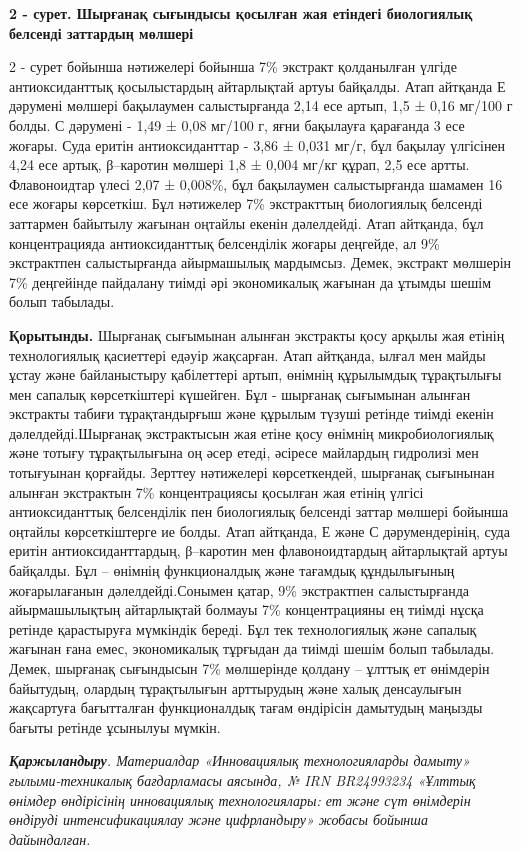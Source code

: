 {\bfseries 2 - сурет. Шырғанақ сығындысы қосылған жая етіндегі биологиялық белсенді заттардың мөлшері}

\begin{multicols}{2}
2 - сурет бойынша нәтижелері бойынша 7\% экстракт қолданылған үлгіде
антиоксиданттық қосылыстардың айтарлықтай артуы байқалды. Атап айтқанда
Е дәрумені мөлшері бақылаумен салыстырғанда 2,14 есе артып, 1,5 ± 0,16
мг/100 г болды. С дәрумені - 1,49 ± 0,08 мг/100 г, яғни бақылауға
қарағанда 3 есе жоғары. Суда еритін антиоксиданттар - 3,86 ± 0,031 мг/г,
бұл бақылау үлгісінен 4,24 есе артық, β--каротин мөлшері 1,8 ± 0,004
мг/кг құрап, 2,5 есе артты. Флавоноидтар үлесі 2,07 ± 0,008\%, бұл
бақылаумен салыстырғанда шамамен 16 есе жоғары көрсеткіш. Бұл нәтижелер
7\% экстракттың биологиялық белсенді заттармен байытылу жағынан оңтайлы
екенін дәлелдейді. Атап айтқанда, бұл концентрацияда антиоксиданттық
белсенділік жоғары деңгейде, ал 9\% экстрактпен салыстырғанда
айырмашылық мардымсыз. Демек, экстракт мөлшерін 7\% деңгейінде пайдалану
тиімді әрі экономикалық жағынан да ұтымды шешім болып табылады.

{\bfseries Қорытынды.} Шырғанақ сығымынан алынған экстракты қосу арқылы жая
етінің технологиялық қасиеттері едәуір жақсарған. Атап айтқанда, ылғал
мен майды ұстау және байланыстыру қабілеттері артып, өнімнің құрылымдық
тұрақтылығы мен сапалық көрсеткіштері күшейген. Бұл - шырғанақ сығымынан
алынған экстракты табиғи тұрақтандырғыш және құрылым түзуші ретінде
тиімді екенін дәлелдейді.Шырғанақ экстрактысын жая етіне қосу өнімнің
микробиологиялық және тотығу тұрақтылығына оң әсер етеді,
әсіресе майлардың гидролизі мен тотығуынан қорғайды. Зерттеу нәтижелері
көрсеткендей, шырғанақ сығынынан алынған экстрактын 7\% концентрациясы
қосылған жая етінің үлгісі антиоксиданттық белсенділік пен биологиялық
белсенді заттар мөлшері бойынша оңтайлы көрсеткіштерге ие болды. Атап
айтқанда, Е және С дәрумендерінің, суда еритін антиоксиданттардың,
β--каротин мен флавоноидтардың айтарлықтай артуы байқалды. Бұл --
өнімнің функционалдық және тағамдық құндылығының жоғарылағанын
дәлелдейді.Сонымен қатар, 9\% экстрактпен салыстырғанда айырмашылықтың
айтарлықтай болмауы 7\% концентрацияны ең тиімді нұсқа ретінде
қарастыруға мүмкіндік береді. Бұл тек технологиялық және сапалық жағынан
ғана емес, экономикалық тұрғыдан да тиімді шешім болып табылады. Демек,
шырғанақ сығындысын 7\% мөлшерінде қолдану -- ұлттық ет өнімдерін
байытудың, олардың тұрақтылығын арттырудың және халық денсаулығын
жақсартуға бағытталған функционалдық тағам өндірісін дамытудың маңызды
бағыты ретінде ұсынылуы мүмкін.

\emph{{\bfseries Қаржыландыру}. Материалдар «Инновациялық технологияларды
дамыту» ғылыми-техникалық бағдарламасы аясында, № IRN BR24993234 «Ұлттық
өнімдер өндірісінің инновациялық технологиялары: ет және сүт өнімдерін
өндіруді интенсификациялау және цифрландыру» жобасы бойынша
дайындалған.}
\end{multicols}

